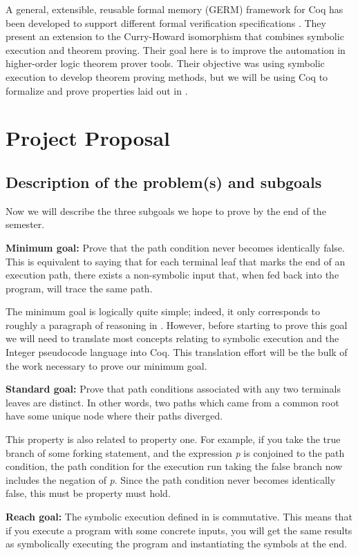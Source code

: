 \documentclass[11pt,conference]{IEEEtran}
\begin{document}
A general, extensible, reusable formal memory (GERM) framework for Coq has been developed to support different formal verification specifications \cite{b4}. They present an extension to the Curry-Howard isomorphism that combines symbolic execution and theorem proving. Their goal here is to improve the automation in higher-order logic theorem prover tools. Their objective was using symbolic execution to develop theorem proving methods, but we will be using Coq to formalize and prove properties laid out in \cite{b1}.  


\section{Project Proposal}

\subsection{Description of the problem(s) and subgoals}
Now we will describe the three subgoals we hope to prove by the end of the semester.

\textbf{Minimum goal:} Prove that the path condition never becomes identically false. This is equivalent to saying that for each terminal leaf that marks the end of an execution path, there exists a non-symbolic input that, when fed back into the program, will trace the same path. 

The minimum goal is logically quite simple; indeed, it only corresponds to roughly a paragraph of reasoning in \cite{b1}. However, before starting to prove this goal we will need to translate most concepts relating to symbolic execution and the Integer pseudocode language into Coq. This translation effort will be the bulk of the work necessary to prove our minimum goal.

\textbf{Standard goal:} Prove that path conditions associated with any two terminals leaves are distinct. In other words, two paths which came from a common root have some unique node where their paths diverged. 

This property is also related to property one. For example, if you take the true branch of some forking statement, and the expression \textit{p} is conjoined to the path condition, the path condition for the execution run taking the false branch now includes the negation of \textit{p}. Since the path condition never becomes identically false, this must be property must hold.

\textbf{Reach goal:} The symbolic execution defined in \cite{b1} is commutative. This means that if you execute a program with some concrete inputs, you will get the same results as symbolically executing the program and instantiating the symbols at the end. 
    
\end{document}
